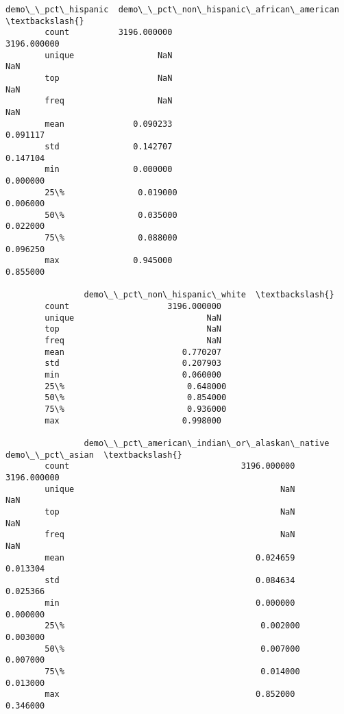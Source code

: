 \documentclass[11pt]{article}
\begin{document}
\begin{Verbatim}[commandchars=\\\{\}]
                demo\_\_pct\_hispanic  demo\_\_pct\_non\_hispanic\_african\_american  \textbackslash{}
        count          3196.000000                              3196.000000   
        unique                 NaN                                      NaN   
        top                    NaN                                      NaN   
        freq                   NaN                                      NaN   
        mean              0.090233                                 0.091117   
        std               0.142707                                 0.147104   
        min               0.000000                                 0.000000   
        25\%               0.019000                                 0.006000   
        50\%               0.035000                                 0.022000   
        75\%               0.088000                                 0.096250   
        max               0.945000                                 0.855000   
        
                demo\_\_pct\_non\_hispanic\_white  \textbackslash{}
        count                    3196.000000   
        unique                           NaN   
        top                              NaN   
        freq                             NaN   
        mean                        0.770207   
        std                         0.207903   
        min                         0.060000   
        25\%                         0.648000   
        50\%                         0.854000   
        75\%                         0.936000   
        max                         0.998000   
        
                demo\_\_pct\_american\_indian\_or\_alaskan\_native  demo\_\_pct\_asian  \textbackslash{}
        count                                   3196.000000      3196.000000   
        unique                                          NaN              NaN   
        top                                             NaN              NaN   
        freq                                            NaN              NaN   
        mean                                       0.024659         0.013304   
        std                                        0.084634         0.025366   
        min                                        0.000000         0.000000   
        25\%                                        0.002000         0.003000   
        50\%                                        0.007000         0.007000   
        75\%                                        0.014000         0.013000   
        max                                        0.852000         0.346000   
        

\end{Verbatim}
\end{document}
